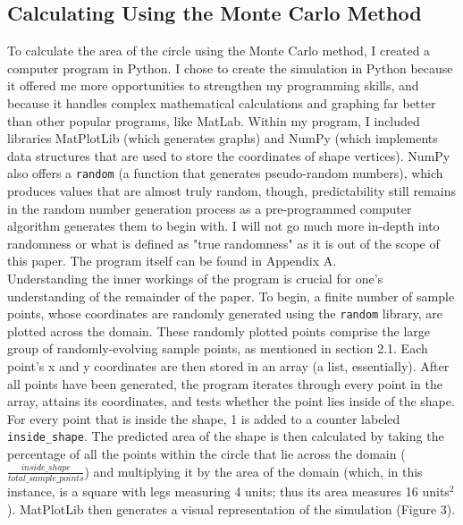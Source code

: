 \documentclass[11pt]{article}
\begin{document}
\subsection{Calculating Using the Monte Carlo Method}
To calculate the area of the circle using the Monte Carlo method, I created a computer program in Python. I chose to create the simulation in Python because it offered me more opportunities to strengthen my programming skills, and because it handles complex mathematical calculations  and graphing far better than other popular programs, like MatLab. Within my program, I included libraries MatPlotLib (which generates graphs) and NumPy (which implements data structures that  are used to store the coordinates of shape vertices). NumPy also offers a 
\texttt{random}
(a function that generates pseudo-random numbers), which produces values that are almost truly random, though, predictability still remains in the random number generation process as a pre-programmed computer algorithm generates them to begin with. I will not go much more in-depth into randomness or what is defined as "true randomness" as it is out of the scope of this paper. The program itself can be found in Appendix A.\\[-2ex]

Understanding the inner workings of the program is crucial for one's understanding of the remainder of the paper. To begin, a finite number of sample points, whose coordinates are randomly generated using the \texttt{random} library, are plotted across the domain. These randomly plotted points comprise the large group of randomly-evolving sample points, as mentioned in section 2.1. Each point's x and y coordinates are then stored in an array (a list, essentially). After all points have been generated, the program iterates through every point in the array, attains its coordinates, and tests whether the point lies inside of the shape. For every point that is inside the shape, 1 is added to a counter labeled \texttt{inside\_shape}. The predicted area of the shape is then calculated by taking the percentage of all the points within the circle that lie across the domain ($ \frac{inside\_shape}{total\_sample\_points}$) and multiplying it by the area of the domain (which, in this instance, is a square with legs measuring 4 units; thus its area measures 16 units$^2$). MatPlotLib then generates a visual representation of the simulation (Figure 3).\\[-5ex]

\end{document}
